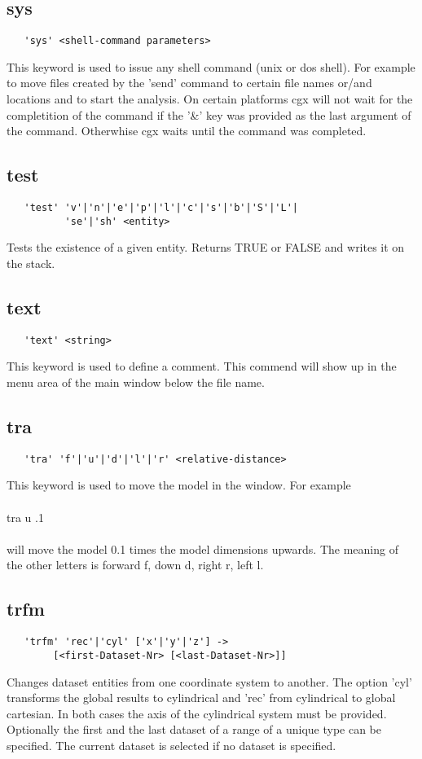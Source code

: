 \documentclass{article}
\begin{document}
\subsection{\label{sys}sys}
\begin{verbatim}
   'sys' <shell-command parameters>
\end{verbatim}
This keyword is used to issue any shell command (unix or dos shell). For example to move files created by the 'send' command to certain file names or/and locations and to start the analysis. On certain platforms cgx will not wait for the completition of the command if the '\&' key was provided as the last argument of the command. Otherwhise cgx waits until the command was completed.

\subsection{\label{test}test}
\begin{verbatim}
   'test' 'v'|'n'|'e'|'p'|'l'|'c'|'s'|'b'|'S'|'L'|
          'se'|'sh' <entity> 
\end{verbatim}
Tests the existence of a given entity. Returns TRUE or FALSE and writes it on the stack.

\subsection{\label{text}text}
\begin{verbatim}
   'text' <string> 
\end{verbatim}
This keyword is used to define a comment. This commend will show up in the menu area of the main window below the file name. 

\subsection{\label{tra}tra}
\begin{verbatim}
   'tra' 'f'|'u'|'d'|'l'|'r' <relative-distance>
\end{verbatim}
This keyword is used to move the model in the window. For example\\\\tra u .1\\\\will move the model 0.1 times the model dimensions upwards. The meaning of the other letters is forward f, down d, right r, left l. 

\subsection{\label{trfm}trfm}
\begin{verbatim}
   'trfm' 'rec'|'cyl' ['x'|'y'|'z'] ->
        [<first-Dataset-Nr> [<last-Dataset-Nr>]]
\end{verbatim}
Changes dataset entities from one coordinate system to another. The option 'cyl' transforms the global results to cylindrical and 'rec' from cylindrical to global cartesian. In both cases the axis of the cylindrical system must be provided. Optionally the first and the last dataset of a range of a unique type can be specified. The current dataset is selected if no dataset is specified.
\end{document}
